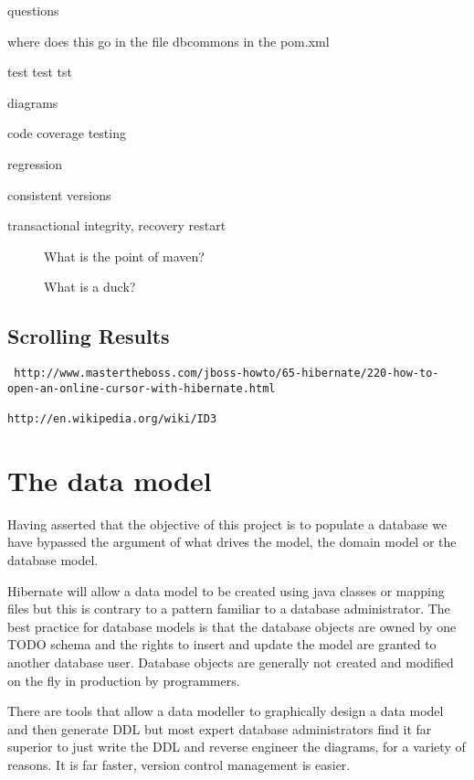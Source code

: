 \documentclass[a4paper,10pt]{book}
\begin{document}
questions 

where does this go in the file  dbcommons in the pom.xml

test test tst

diagrams

code coverage testing

regression

consistent versions

transactional integrity, recovery restart
\begin{figure}[htpb]
	\begin{boxedminipage}{2in}
		What is the point of maven?

	        What is a duck?
	\end{boxedminipage}
	\label{box:mybox}
\end{figure}
\section{Scrolling Results}
\begin{verbatim}
 http://www.mastertheboss.com/jboss-howto/65-hibernate/220-how-to-open-an-online-cursor-with-hibernate.html

http://en.wikipedia.org/wiki/ID3
\end{verbatim}

\chapter{The data model}
Having asserted that the objective of this project is to populate a database we have bypassed the argument
of what drives the model, the domain model or the database model.

Hibernate will allow a data model to be created using java classes or mapping files but this is contrary
to a pattern familiar to a database administrator.  The best practice for database models is that the database 
objects are owned by one TODO schema and the rights to insert and update the model are granted to another 
database user.  Database objects are generally not created and modified on the fly in production by 
programmers.   

There are tools that allow a data modeller to graphically design a data model and then generate DDL
but most expert database administrators find it far superior to just write the DDL and reverse engineer
the diagrams, for a variety of reasons.  It is far faster, version control management is easier.
\end{document}

